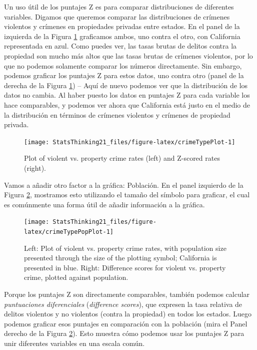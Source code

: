 \documentclass[
  12pt,
]{book}
\theoremstyle{definition}
\theoremstyle{definition}
\theoremstyle{definition}
\theoremstyle{remark}
\begin{document}
Un uso útil de los puntajes Z es para comparar distribuciones de diferentes variables. Digamos que queremos comparar las distribuciones de crímenes violentos y crímenes en propiedades privadas entre estados. En el panel de la izquierda de la Figura \ref{fig:crimeTypePlot} graficamos ambos, uno contra el otro, con California representada en azul. Como puedes ver, las tasas brutas de delitos contra la propiedad son mucho más altos que las tasas brutas de crímenes violentos, por lo que no podemos solamente comparar los números directamente. Sin embargo, podemos graficar los puntajes Z para estos datos, uno contra otro (panel de la derecha de la Figura \ref{fig:crimeTypePlot}) -- Aquí de nuevo podemos ver que la distribución de los datos no cambia. Al haber puesto los datos en puntajes Z para cada variable los hace comparables, y podemos ver ahora que California está justo en el medio de la distribución en términos de crímenes violentos y crímenes de propiedad privada.

\begin{figure}
\texttt{[image: StatsThinking21\_files/figure-latex/crimeTypePlot-1]} \caption{Plot of violent vs. property crime rates (left) and Z-scored rates (right).}\label{fig:crimeTypePlot}
\end{figure}

Vamos a añadir otro factor a la gráfica: Población. En el panel izquierdo de la Figura \ref{fig:crimeTypePopPlot}, mostramos esto utilizando el tamaño del símbolo para graficar, el cual es comúnmente una forma útil de añadir información a la gráfica.

\begin{figure}
\texttt{[image: StatsThinking21\_files/figure-latex/crimeTypePopPlot-1]} \caption{Left: Plot of violent vs. property crime rates, with population size presented through the size of the plotting symbol; California is presented in blue. Right: Difference scores for violent vs. property crime, plotted against population. }\label{fig:crimeTypePopPlot}
\end{figure}

Porque los puntajes Z son directamente comparables, también podemos calcular \emph{puntuaciones diferenciales} (\emph{difference scores}), que expresen la tasa relativa de delitos violentos y no violentos (contra la propiedad) en todos los estados. Luego podemos graficar esos puntajes en comparación con la población (mira el Panel derecho de la Figura \ref{fig:crimeTypePopPlot}). Esto muestra cómo podemos usar los puntajes Z para unir diferentes variables en una escala común.
\end{document}
